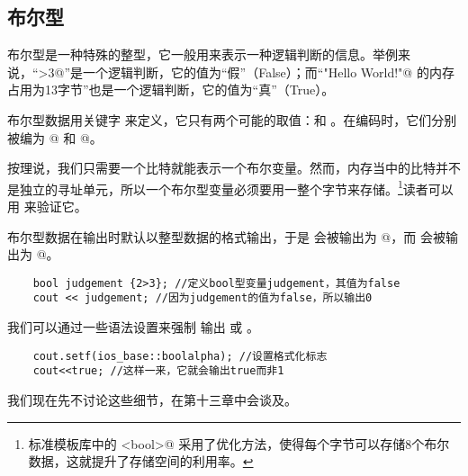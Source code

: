 \subsection*{布尔型}
布尔型是一种特殊的整型，它一般用来表示一种逻辑判断的信息。举例来说，``>3@''是一个逻辑判断，它的值为``假''（False）；而``\lstinline@"Hello World!"@ 的内存占用为13字节''也是一个逻辑判断，它的值为``真''（True）。\par
布尔型数据用关键字 \lstinline@bool@ 来定义，它只有两个可能的取值：\lstinline@true@ 和 \lstinline@false@。在编码时，它们分别被编为 @ 和 @。\par
按理说，我们只需要一个比特就能表示一个布尔变量。然而，内存当中的比特并不是独立的寻址单元，所以一个布尔型变量必须要用一整个字节来存储。\footnote{标准模板库中的 \lstinline@vector<bool>@ 采用了优化方法，使得每个字节可以存储8个布尔数据，这就提升了存储空间的利用率。}读者可以用 \lstinline@sizeof@ 来验证它。\par
布尔型数据在输出时默认以整型数据的格式输出，于是 \lstinline@false@ 会被输出为 @，而 \lstinline@true@ 会被输出为 @。
\begin{lstlisting}
    bool judgement {2>3}; //定义bool型变量judgement，其值为false
    cout << judgement; //因为judgement的值为false，所以输出0
\end{lstlisting}
我们可以通过一些语法设置来强制 \lstinline@cout@ 输出 \lstinline@true@ 或 \lstinline@false@。
\begin{lstlisting}
    cout.setf(ios_base::boolalpha); //设置格式化标志
    cout<<true; //这样一来，它就会输出true而非1
\end{lstlisting}
我们现在先不讨论这些细节，在第十三章中会谈及。\par
